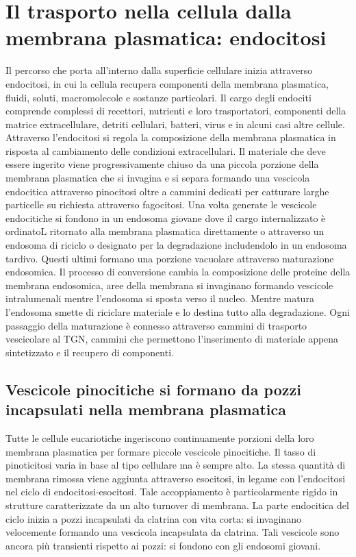 \section{Il trasporto nella cellula dalla membrana plasmatica: endocitosi}
Il percorso che porta all'interno dalla superficie cellulare inizia attraverso endocitosi, in cui la cellula recupera componenti della membrana plasmatica, fluidi, soluti, macromolecole
e sostanze particolari. Il cargo degli endociti comprende complessi di recettori, nutrienti e loro trasportatori, componenti della matrice extracellulare, detriti cellulari, batteri, 
virus e in alcuni casi altre cellule. Attraverso l'endocitosi si regola la composizione della membrana plasmatica in risposta al cambiamento delle condizioni extracellulari. Il 
materiale che deve essere ingerito viene progressivamente chiuso da una piccola porzione della membrana plasmatica che si invagina e si separa formando una vescicola endocitica 
attraverso pinocitosi oltre a cammini dedicati per catturare larghe particelle su richiesta attraverso fagocitosi. Una volta generate le vescicole endocitiche si fondono in un
endosoma giovane dove il cargo internalizzato \`e ordinatoL ritornato alla membrana plasmatica direttamente o attraverso un endosoma di riciclo o designato per la degradazione 
includendolo in un endosoma tardivo. Questi ultimi formano una porzione vacuolare attraverso maturazione endosomica. Il processo di conversione cambia la composizione delle proteine
della membrana endosomica, aree della membrana si invaginano formando vescicole intralumenali mentre l'endosoma si sposta verso il nucleo. Mentre matura l'endosoma smette di riciclare
materiale e lo destina tutto alla degradazione. Ogni passaggio della maturazione \`e connesso attraverso cammini di trasporto vescicolare al TGN, cammini che permettono l'inserimento
di materiale appena sintetizzato e il recupero di componenti.
\subsection{Vescicole pinocitiche si formano da pozzi incapsulati nella membrana plasmatica}
Tutte le cellule eucariotiche ingeriscono continuamente porzioni della loro membrana plasmatica per formare piccole vescicole pinocitiche. Il tasso di pinoticitosi varia in base al tipo
cellulare ma \`e sempre alto. La stessa quantit\`a di membrana rimossa viene aggiunta attraverso esocitosi, in legame con l'endocitosi nel ciclo di endocitosi-esocitosi. Tale 
accoppiamento \`e particolarmente rigido in strutture caratterizzate da un alto turnover di membrana. La parte endocitica del ciclo inizia a pozzi incapsulati da clatrina con vita corta:
si invaginano velocemente formando una vescicola incapsulata da clatrina. Tali vescicole sono ancora pi\`u transienti rispetto ai pozzi: si fondono con gli endosomi giovani.
